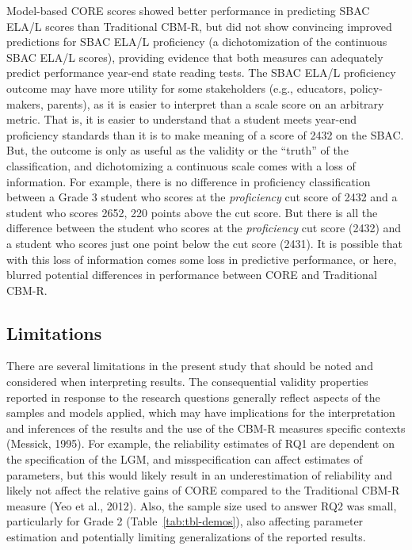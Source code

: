 \documentclass[
  english,
  man, fleqn, noextraspace]{apa6}
\begin{document}
Model-based CORE scores showed better performance in predicting SBAC ELA/L scores than Traditional CBM-R, but did not show convincing improved predictions for SBAC ELA/L proficiency (a dichotomization of the continuous SBAC ELA/L scores), providing evidence that both measures can adequately predict performance year-end state reading tests. The SBAC ELA/L proficiency outcome may have more utility for some stakeholders (e.g., educators, policy-makers, parents), as it is easier to interpret than a scale score on an arbitrary metric. That is, it is easier to understand that a student meets year-end proficiency standards than it is to make meaning of a score of 2432 on the SBAC. But, the outcome is only as useful as the validity or the \enquote{truth} of the classification, and dichotomizing a continuous scale comes with a loss of information. For example, there is no difference in proficiency classification between a Grade 3 student who scores at the \emph{proficiency} cut score of 2432 and a student who scores 2652, 220 points above the cut score. But there is all the difference between the student who scores at the \emph{proficiency} cut score (2432) and a student who scores just one point below the cut score (2431). It is possible that with this loss of information comes some loss in predictive performance, or here, blurred potential differences in performance between CORE and Traditional CBM-R.

\hypertarget{limitations}{%
\subsection{Limitations}\label{limitations}}

There are several limitations in the present study that should be noted and considered when interpreting results. The consequential validity properties reported in response to the research questions generally reflect aspects of the samples and models applied, which may have implications for the interpretation and inferences of the results and the use of the CBM-R measures specific contexts (Messick, 1995). For example, the reliability estimates of RQ1 are dependent on the specification of the LGM, and misspecification can affect estimates of parameters, but this would likely result in an underestimation of reliability and likely not affect the relative gains of CORE compared to the Traditional CBM-R measure (Yeo et al., 2012). Also, the sample size used to answer RQ2 was small, particularly for Grade 2 (Table~\ref{tab:tbl-demos}), also affecting parameter estimation and potentially limiting generalizations of the reported results.
\end{document}

